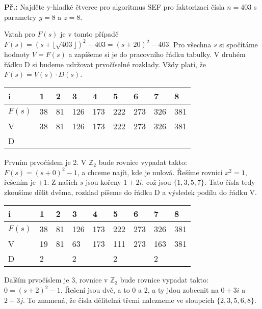 \documentclass[10pt,a4paper]{article}
\begin{document}
\begin{exercise}
\textbf{Př.:} Najděte y-hladké čtverce pro algoritmus SEF pro faktorizaci čísla
$n=403$ s parametry $y = 8$ a $z=8$.

Vztah pro $F(s)$ je v tomto případě $F(s) = (s +\lfloor \sqrt{403} \rfloor)^2 -
403= (s + 20)^2 - 403$. Pro všechna $s$ si spočítáme hodnoty $V = F(s)$ a
zapíšeme si je do pracovního řádku tabulky. V druhém řádku D si budeme udržovat
prvočíselné rozklady. Vždy platí, že $F(s) = V(s) \cdot D(s)$.

\begin{center}
\begin{tabular}{|p{1cm}|p{1cm}|p{1cm}|p{1cm}|p{1cm}|p{1cm}|p{1cm}|p{1cm}|p{1cm}|}
\hline
i & 1 & 2 &3 & 4 & 5 & 6 & 7 & 8\\
\hline
\hline
$F(s)$ & 38 & 81 & 126 & 173 & 222 & 273 & 326 & 381\\
\hline
V & 38 & 81 & 126 & 173 & 222 & 273 & 326 & 381\\
\hline
D &  &   &  &   &   &  &   &  \\
\hline
\end{tabular}
\end{center}

Prvním prvočíslem je 2. V $\mathbb{Z}_2$ bude rovnice vypadat takto: $F(s) = (s
+ 0)^2 - 1$, a chceme najít, kde je nulová. Řešíme rovnici $x^2 = 1$, řešením je
$\pm1$. Z našich $s$ jsou kořeny $1 + 2i$, což jsou $\{1, 3, 5, 7\}$. Tato čísla
tedy zkoušíme dělit dvěma, rozklad píšeme do řádku D a výsledek podílu do řádku
V.

\begin{center}
\begin{tabular}{|p{1cm}|p{1cm}|p{1cm}|p{1cm}|p{1cm}|p{1cm}|p{1cm}|p{1cm}|p{1cm}|}
\hline
i & \textbf{1} & 2 &\textbf{3} & 4 & \textbf{5} & 6 & \textbf{7} & 8\\
\hline
\hline
$F(s)$ & 38 & 81 & 126 & 173 & 222 & 273 & 326 & 381\\
\hline
V & 19 & 81 & 63 & 173 & 111 & 273 & 163 & 381\\
\hline
D & 2  &       & 2   &         & 2     &         &  2    &  \\
\hline
\end{tabular}
\end{center}

Dalším prvočíslem je 3, rovnice v $\mathbb{Z}_3$ bude rovnice vypadat takto: $0
= (s + 2)^2 - 1$. Řešení jsou dvě, a to 0 a 2, a ty jdou zobecnit na $0 + 3i$ a
$2 + 3j$.  To znamená, že čísla dělitelná třemi nalezneme ve sloupcích $\{2, 3,
5, 6, 8\}$.


\end{exercise}
\end{document}
